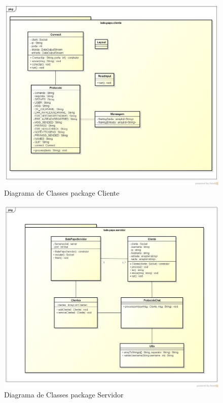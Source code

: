 \documentclass{abnt}
\begin{document}
	\begin{figure}[htp]
		\begin{center}
			\includegraphics[width=500px]{diagramacliente}
			\caption{Diagrama de Classes package Cliente}
		\end{center}
	\end{figure}
	\begin{figure}[htp2]
				\begin{center}
					\includegraphics[width=500px]{diagramaservidor}
					\caption{Diagrama de Classes package Servidor}
				\end{center}
	\end{figure}
	\FloatBarrier
	
\end{document}
